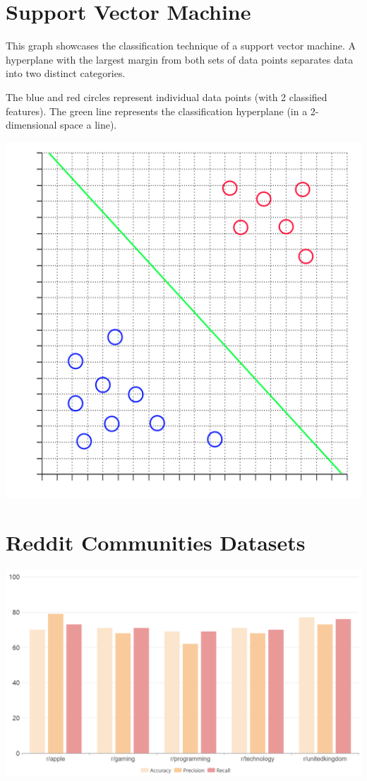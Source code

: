\documentclass[12pt,journal,compsoc]{IEEEtran}
\begin{document}
\newpage %

\section{Support Vector Machine}
This graph showcases the classification technique of a support vector machine. A hyperplane with the largest margin from both sets of data points separates data into two distinct categories.

The blue and red circles represent individual data points (with 2 classified features). The green line represents the classification hyperplane (in a 2-dimensional space a line).
\begin{center}
  \includegraphics[scale=1.7]{support-vector-machine-showcase-graph.png}
\end{center}

\section{Reddit Communities Datasets}
\begin{center}
  \includegraphics[scale=0.24]{reddit-communities-datasets.png}
\end{center}
\end{document}
